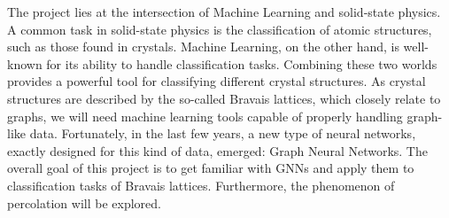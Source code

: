 The project lies at the intersection of Machine Learning and solid-state physics. 
A common task in solid-state physics is the classification of atomic structures, such as those found in crystals.
Machine Learning, on the other hand, is well-known for its ability to handle classification tasks. Combining these two worlds provides a powerful tool for 
classifying different crystal structures. 
As crystal structures are described by the so-called Bravais lattices, which closely relate to graphs, we will need machine learning tools capable of properly handling graph-like data.
Fortunately, in the last few years, a new type of neural networks, exactly designed for this kind of data, emerged: Graph Neural Networks.
The overall goal of this project is to get familiar with GNNs and apply them to classification tasks of Bravais lattices. 
Furthermore, the phenomenon of percolation will be explored.